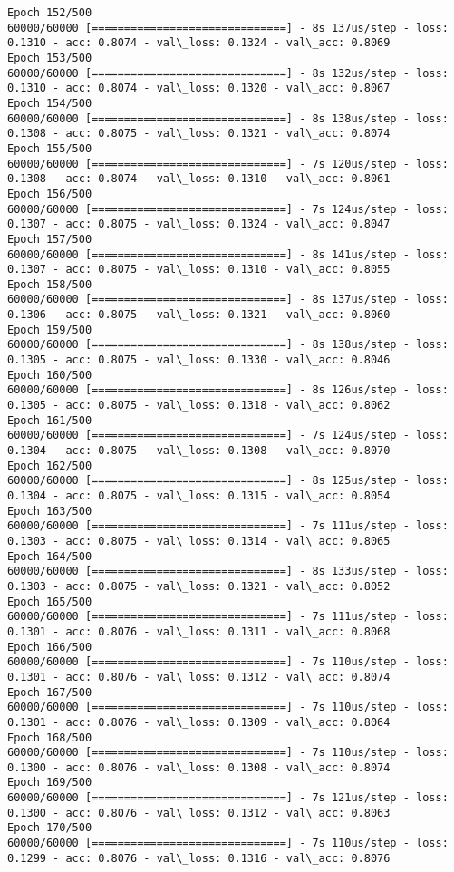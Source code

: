 \documentclass[11pt]{article}
\begin{document}
\begin{Verbatim}[commandchars=\\\{\}]
Epoch 152/500
60000/60000 [==============================] - 8s 137us/step - loss: 0.1310 - acc: 0.8074 - val\_loss: 0.1324 - val\_acc: 0.8069
Epoch 153/500
60000/60000 [==============================] - 8s 132us/step - loss: 0.1310 - acc: 0.8074 - val\_loss: 0.1320 - val\_acc: 0.8067
Epoch 154/500
60000/60000 [==============================] - 8s 138us/step - loss: 0.1308 - acc: 0.8075 - val\_loss: 0.1321 - val\_acc: 0.8074
Epoch 155/500
60000/60000 [==============================] - 7s 120us/step - loss: 0.1308 - acc: 0.8074 - val\_loss: 0.1310 - val\_acc: 0.8061
Epoch 156/500
60000/60000 [==============================] - 7s 124us/step - loss: 0.1307 - acc: 0.8075 - val\_loss: 0.1324 - val\_acc: 0.8047
Epoch 157/500
60000/60000 [==============================] - 8s 141us/step - loss: 0.1307 - acc: 0.8075 - val\_loss: 0.1310 - val\_acc: 0.8055
Epoch 158/500
60000/60000 [==============================] - 8s 137us/step - loss: 0.1306 - acc: 0.8075 - val\_loss: 0.1321 - val\_acc: 0.8060
Epoch 159/500
60000/60000 [==============================] - 8s 138us/step - loss: 0.1305 - acc: 0.8075 - val\_loss: 0.1330 - val\_acc: 0.8046
Epoch 160/500
60000/60000 [==============================] - 8s 126us/step - loss: 0.1305 - acc: 0.8075 - val\_loss: 0.1318 - val\_acc: 0.8062
Epoch 161/500
60000/60000 [==============================] - 7s 124us/step - loss: 0.1304 - acc: 0.8075 - val\_loss: 0.1308 - val\_acc: 0.8070
Epoch 162/500
60000/60000 [==============================] - 8s 125us/step - loss: 0.1304 - acc: 0.8075 - val\_loss: 0.1315 - val\_acc: 0.8054
Epoch 163/500
60000/60000 [==============================] - 7s 111us/step - loss: 0.1303 - acc: 0.8075 - val\_loss: 0.1314 - val\_acc: 0.8065
Epoch 164/500
60000/60000 [==============================] - 8s 133us/step - loss: 0.1303 - acc: 0.8075 - val\_loss: 0.1321 - val\_acc: 0.8052
Epoch 165/500
60000/60000 [==============================] - 7s 111us/step - loss: 0.1301 - acc: 0.8076 - val\_loss: 0.1311 - val\_acc: 0.8068
Epoch 166/500
60000/60000 [==============================] - 7s 110us/step - loss: 0.1301 - acc: 0.8076 - val\_loss: 0.1312 - val\_acc: 0.8074
Epoch 167/500
60000/60000 [==============================] - 7s 110us/step - loss: 0.1301 - acc: 0.8076 - val\_loss: 0.1309 - val\_acc: 0.8064
Epoch 168/500
60000/60000 [==============================] - 7s 110us/step - loss: 0.1300 - acc: 0.8076 - val\_loss: 0.1308 - val\_acc: 0.8074
Epoch 169/500
60000/60000 [==============================] - 7s 121us/step - loss: 0.1300 - acc: 0.8076 - val\_loss: 0.1312 - val\_acc: 0.8063
Epoch 170/500
60000/60000 [==============================] - 7s 110us/step - loss: 0.1299 - acc: 0.8076 - val\_loss: 0.1316 - val\_acc: 0.8076

\end{Verbatim}
\end{document}
